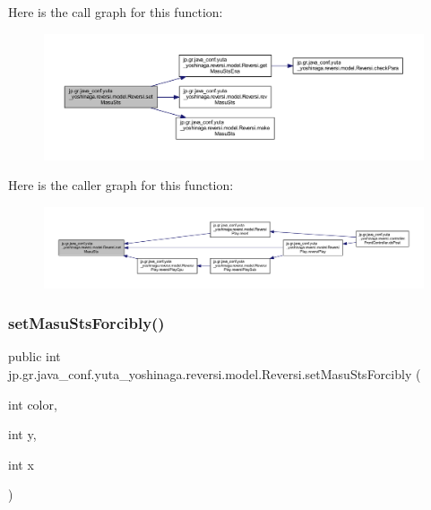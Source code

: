 Here is the call graph for this function\+:
\nopagebreak
\begin{figure}[H]
\begin{center}
\leavevmode
\includegraphics[width=350pt]{classjp_1_1gr_1_1java__conf_1_1yuta__yoshinaga_1_1reversi_1_1model_1_1_reversi_a7abf9238b933653eec2908f6e1a863db_cgraph}
\end{center}
\end{figure}
Here is the caller graph for this function\+:
\nopagebreak
\begin{figure}[H]
\begin{center}
\leavevmode
\includegraphics[width=350pt]{classjp_1_1gr_1_1java__conf_1_1yuta__yoshinaga_1_1reversi_1_1model_1_1_reversi_a7abf9238b933653eec2908f6e1a863db_icgraph}
\end{center}
\end{figure}
\mbox{\label{classjp_1_1gr_1_1java__conf_1_1yuta__yoshinaga_1_1reversi_1_1model_1_1_reversi_af2ba1c808c067c94106d04ccd5e25e3b}} 
\subsubsection{\texorpdfstring{set\+Masu\+Sts\+Forcibly()}{setMasuStsForcibly()}}
{\footnotesize\ttfamily public int jp.\+gr.\+java\+\_\+conf.\+yuta\+\_\+yoshinaga.\+reversi.\+model.\+Reversi.\+set\+Masu\+Sts\+Forcibly (\begin{DoxyParamCaption}\item[{int}]{color,  }\item[{int}]{y,  }\item[{int}]{x }\end{DoxyParamCaption})}



